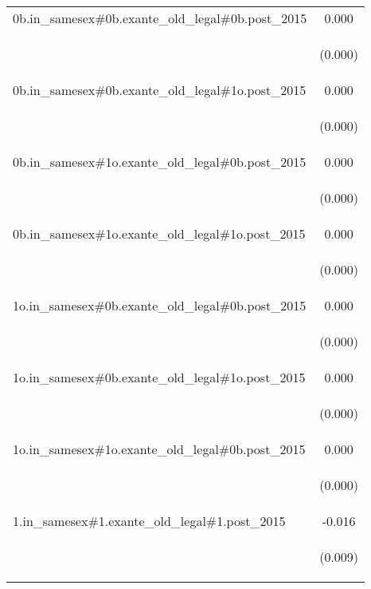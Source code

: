 \documentclass[]{article}
\begin{document}
\begin{center}
\begin{tabular}{lc}
0b.in\_samesex\#0b.exante\_old\_legal\#0b.post\_2015 & 0.000 \\
\vspace{4pt} & \begin{footnotesize}(0.000)\end{footnotesize} \\
0b.in\_samesex\#0b.exante\_old\_legal\#1o.post\_2015 & 0.000 \\
\vspace{4pt} & \begin{footnotesize}(0.000)\end{footnotesize} \\
0b.in\_samesex\#1o.exante\_old\_legal\#0b.post\_2015 & 0.000 \\
\vspace{4pt} & \begin{footnotesize}(0.000)\end{footnotesize} \\
0b.in\_samesex\#1o.exante\_old\_legal\#1o.post\_2015 & 0.000 \\
\vspace{4pt} & \begin{footnotesize}(0.000)\end{footnotesize} \\
1o.in\_samesex\#0b.exante\_old\_legal\#0b.post\_2015 & 0.000 \\
\vspace{4pt} & \begin{footnotesize}(0.000)\end{footnotesize} \\
1o.in\_samesex\#0b.exante\_old\_legal\#1o.post\_2015 & 0.000 \\
\vspace{4pt} & \begin{footnotesize}(0.000)\end{footnotesize} \\
1o.in\_samesex\#1o.exante\_old\_legal\#0b.post\_2015 & 0.000 \\
\vspace{4pt} & \begin{footnotesize}(0.000)\end{footnotesize} \\
1.in\_samesex\#1.exante\_old\_legal\#1.post\_2015 & -0.016 \\
\vspace{4pt} & \begin{footnotesize}(0.009)\end{footnotesize} \\

\end{tabular}
\end{center}
\end{document}
